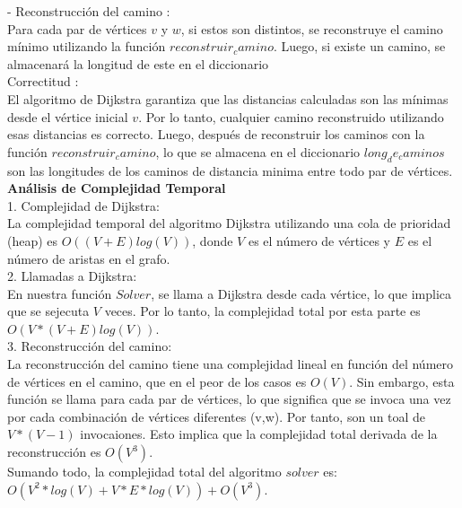 \documentclass[
10pt, %
a4paper, %
oneside, %
headinclude,footinclude, %
BCOR5mm, %
]{scrartcl}
\begin{document}
- Reconstrucción del camino : \\
Para cada par de vértices $v$ y $w$, si estos son distintos, se reconstruye el camino mínimo utilizando la función $reconstruir_camino$. Luego, 
si existe un camino, se almacenará la longitud de este en el diccionario\\


Correctitud : \\
El algoritmo de Dijkstra garantiza que las distancias calculadas son las mínimas desde el vértice inicial $v$. Por lo tanto, 
cualquier camino reconstruido utilizando esas distancias es correcto. Luego, después de reconstruir los caminos con la función $reconstruir_camino$, 
lo que se almacena en el diccionario $long_de_caminos$ son las longitudes de los caminos de distancia minima entre todo par de 
vértices.\\


\textbf{Análisis de Complejidad Temporal}\\

1. Complejidad de Dijkstra:\\

La complejidad temporal del algoritmo Dijkstra utilizando una cola de prioridad (heap) es $O((V+E)log(V))$, donde $V$ es el número de vértices y $E$ es el número de 
aristas en el grafo.\\

2. Llamadas a Dijkstra:\\

En nuestra función $Solver$, se llama a Dijkstra desde cada vértice, lo que implica que se sejecuta $V$ veces. 
Por lo tanto, la complejidad total por esta parte es $O(V*(V+E)log(V))$. \\

3. Reconstrucción del camino:\\

La reconstrucción del camino tiene una complejidad lineal en función del número de vértices en el camino, que en el peor 
de los casos es $O(V)$. Sin embargo, esta función se llama para cada par de vértices, lo que significa que se invoca una vez por cada 
combinación de vértices diferentes (v,w). Por tanto, son un toal de $V*(V-1)$ invocaiones. Esto implica que la complejidad total derivada de la 
reconstrucción es $O(V^3)$. \\

Sumando todo, la complejidad total del algoritmo $solver$ es: $O(V^2 * log(V) + V * E*log(V) ) + O(V^3)$. \\
\end{document}
